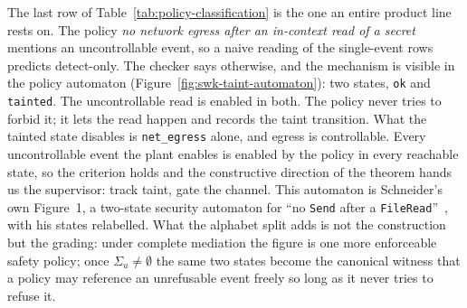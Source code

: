\documentclass[11pt,a4paper]{article}
\theoremstyle{definition}
\theoremstyle{remark}
\begin{document}
The last row of Table~\ref{tab:policy-classification} is the one an entire product line
rests on. The policy \emph{no network egress after an in-context read of a secret} mentions an
uncontrollable event, so a naive reading of the single-event rows predicts detect-only. The
checker says otherwise, and the mechanism is visible in the policy automaton
(Figure~\ref{fig:swk-taint-automaton}): two states,
\texttt{ok} and \texttt{tainted}. The uncontrollable read is enabled in both. The policy never
tries to forbid it; it lets the read happen and records the taint transition. What the
tainted state disables is \texttt{net\_egress} alone, and egress is controllable. Every
uncontrollable event the plant enables is enabled by the policy in every reachable state, so
the criterion holds and the constructive direction of the theorem hands us the supervisor:
track taint, gate the channel. This automaton is Schneider's own Figure~1, a two-state
security automaton for ``no \texttt{Send} after a \texttt{FileRead}''~,
with his states relabelled. What the alphabet split adds is not the construction but the
grading: under complete mediation the figure is one more enforceable safety policy; once
$\Sigma_u \neq \emptyset$ the same two states become the canonical witness that a policy may
reference an unrefusable event freely so long as it never tries to refuse it.


\end{document}
